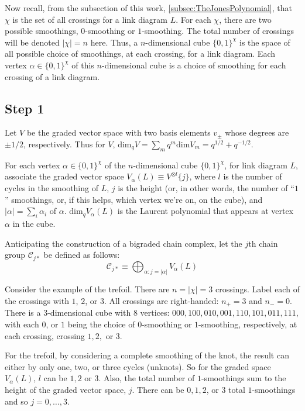 \documentclass[a4paper,titlepage,twoside]{book}
\begin{document}
Now recall, from the subsection of this work, \ref{subsec:TheJonesPolynomial}, that $\chi$ is the set of all crossings for a link diagram $L$.  For each $\chi$, there are two possible smoothings, $0$-smoothing or $1$-smoothing.  The total number of crossings will be denoted $|\chi|=n$ here.  Thus, a $n$-dimensional cube $\lbrace 0, 1 \rbrace^{\chi}$ is the space of all possible choice of smoothings, at each crossing, for a link diagram.  Each vertex $\alpha \in \lbrace 0 ,1 \rbrace^{\chi}$ of this $n$-dimensional cube is a choice of smoothing for each crossing of a link diagram.  



\subsection{Step 1}

Let $V$ be the graded vector space with two basis elements $v_{\pm}$ whose degrees are $\pm 1/2$, respectively.  Thus for $V$, $\text{dim}_q{V} = \sum_m q^m \text{dim}{ V_m} = q^{1/2} + q^{-1/2}$.  

For each vertex $\alpha \in \lbrace 0 , 1 \rbrace^{\chi}$ of the $n$-dimensional cube $\lbrace 0 , 1 \rbrace^{\chi}$, for link diagram $L$, associate the graded vector space $V_{\alpha}(L) \equiv V^{ \otimes l}{ \lbrace j \rbrace}$, where $l$ is the number of cycles in the smoothing of $L$, $j$ is the height (or, in other words, the number of ``$1$'' smoothings, or, if this helps, which vertex we're on, on the cube), and $|\alpha | =\sum_i \alpha_i$ of $\alpha$.   $\text{dim}_q{ V_{\alpha}{ (L)} }$ is the Laurent polynomial that appears at vertex $\alpha$ in the cube.  

Anticipating the construction of a bigraded chain complex, let the $j$th chain group $\mathcal{C}_{j*}$ be defined as follows: 
\begin{equation}
\mathcal{C}_{j*} \equiv \bigoplus_{ \alpha : j = | \alpha | } V_{\alpha}{ (L)}
\end{equation}

Consider the example of the trefoil.  There are $n = | \chi | = 3$ crossings.  Label each of the crossings with $1$, $2$, or $3$.  All crossings are right-handed: $n_+=3$ and $n_- =0$.  There is a 3-dimensional cube with 8 vertices: $000, 100, 010, 001 , 110, 101, 011, 111$, with each $0$, or $1$ being the choice of $0$-smoothing or $1$-smoothing, respectively, at each crossing, crossing $1, 2,$ or $3$.

For the trefoil, by considering a complete smoothing of the knot, the result can either by only one, two, or three cycles (unknots).  So for the graded space $V_{\alpha}{(L)}$, $l$ can be $1, 2$ or $3$.  Also, the total number of $1$-smoothings sum to the height of the graded vector space, $j$.  There can be $0,1,2$, or $3$ total $1$-smoothings and so $j=0, \dots , 3$.  
\end{document}
